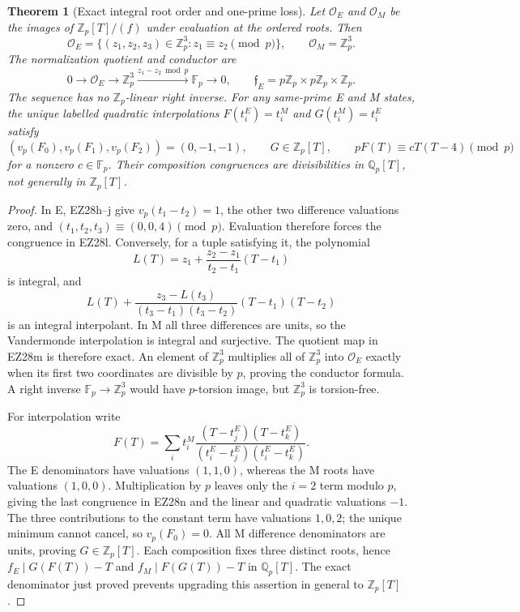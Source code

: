 \documentclass[11pt]{article}
\newtheorem{theorem}{Theorem}[section]
\theoremstyle{definition}\newtheorem{definition}[theorem]{Definition}
\theoremstyle{remark}\newtheorem{remark}[theorem]{Remark}
\newcommand{\Q}{\mathbb Q}
\newcommand{\Z}{\mathbb Z}
\newcommand{\F}{\mathbb F}
\begin{document}
\begin{theorem}[Exact integral root order and one-prime loss]
Let \(\mathcal O_E\) and \(\mathcal O_M\) be the images of
\(\Z_p[T]/(f)\) under evaluation at the ordered roots.  Then
\begin{equation}
 \boxed{\mathcal O_E=
 \{(z_1,z_2,z_3)\in\Z_p^3:z_1\equiv z_2\pmod p\},
 \qquad \mathcal O_M=\Z_p^3.}                          \tag{EZ28l}
\end{equation}
The normalization quotient and conductor are
\begin{equation}
 0\longrightarrow\mathcal O_E\longrightarrow\Z_p^3
 \xrightarrow{z_1-z_2\bmod p}\F_p\longrightarrow0,
 \qquad
 \mathfrak f_E=p\Z_p\times p\Z_p\times\Z_p.          \tag{EZ28m}
\end{equation}
The sequence has no \(\Z_p\)-linear right inverse.  For any same-prime E and M
states, the unique labelled quadratic interpolations \(F(t_i^E)=t_i^M\) and
\(G(t_i^M)=t_i^E\) satisfy
\begin{equation}
 (v_p(F_0),v_p(F_1),v_p(F_2))=(0,-1,-1),\qquad
 G\in\Z_p[T],\qquad pF(T)\equiv cT(T-4)\pmod p         \tag{EZ28n}
\end{equation}
for a nonzero \(c\in\F_p\).  Their composition congruences are divisibilities
in \(\Q_p[T]\), not generally in \(\Z_p[T]\).
\end{theorem}

\begin{proof}
In E, EZ28h--j give
\(v_p(t_1-t_2)=1\), the other two difference valuations zero, and
\((t_1,t_2,t_3)\equiv(0,0,4)\pmod p\).  Evaluation therefore forces the
congruence in EZ28l.  Conversely, for a tuple satisfying it, the polynomial
\[
 L(T)=z_1+\frac{z_2-z_1}{t_2-t_1}(T-t_1)
\]
is integral, and
\[
 L(T)+\frac{z_3-L(t_3)}{(t_3-t_1)(t_3-t_2)}
             (T-t_1)(T-t_2)
\]
is an integral interpolant.  In M all three differences are units, so the
Vandermonde interpolation is integral and surjective.  The quotient map in
EZ28m is therefore exact.  An element of \(\Z_p^3\) multiplies all of
\(\Z_p^3\) into \(\mathcal O_E\) exactly when its first two coordinates are
divisible by \(p\), proving the conductor formula.  A right inverse
\(\F_p\to\Z_p^3\) would have \(p\)-torsion image, but \(\Z_p^3\) is
torsion-free.

For interpolation write
\[
 F(T)=\sum_i t_i^M
 \frac{(T-t_j^E)(T-t_k^E)}{(t_i^E-t_j^E)(t_i^E-t_k^E)}.
\]
The E denominators have valuations \((1,1,0)\), whereas the M roots have
valuations \((1,0,0)\).  Multiplication by \(p\) leaves only the \(i=2\) term
modulo \(p\), giving the last congruence in EZ28n and the linear and quadratic
valuations \(-1\).  The three contributions to the constant term have
valuations \(1,0,2\); the unique minimum cannot cancel, so \(v_p(F_0)=0\).
All M difference denominators are units, proving \(G\in\Z_p[T]\).  Each
composition fixes three distinct roots, hence
\(f_E\mid G(F(T))-T\) and \(f_M\mid F(G(T))-T\) in \(\Q_p[T]\).  The exact
denominator just proved prevents upgrading this assertion in general to
\(\Z_p[T]\).
\end{proof}
\end{document}

